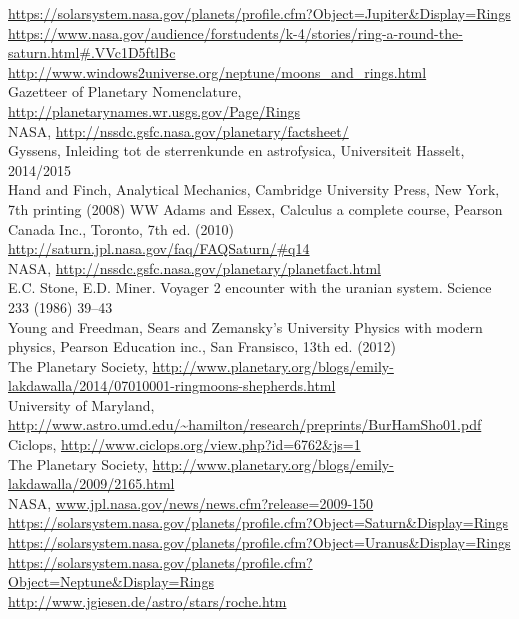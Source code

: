 \documentclass[a4paper]{article}
\begin{document}
\noindent\text{[1]} \url{https://solarsystem.nasa.gov/planets/profile.cfm?Object=Jupiter&Display=Rings}\\
\text{[2]} \url{https://www.nasa.gov/audience/forstudents/k-4/stories/ring-a-round-the-saturn.html#.VVc1D5ftlBc}\\
\text{[3]} \url{http://www.windows2universe.org/neptune/moons_and_rings.html}\\
\text{[4]} Gazetteer of Planetary Nomenclature, \url{http://planetarynames.wr.usgs.gov/Page/Rings}\\
\text{[5]} NASA, \url{http://nssdc.gsfc.nasa.gov/planetary/factsheet/} \\
\text{[6]} Gyssens, Inleiding tot de sterrenkunde en astrofysica, Universiteit Hasselt, 2014/2015 \\
\text{[7]} Hand and Finch, Analytical Mechanics, Cambridge University Press, New York, 7th printing (2008) WW
\text{[8]} Adams and Essex, Calculus a complete course, Pearson Canada Inc., Toronto, 7th ed. (2010) \\
\text{[9]} \url{http://saturn.jpl.nasa.gov/faq/FAQSaturn/#q14} \\
\text{[10]} NASA, \url{http://nssdc.gsfc.nasa.gov/planetary/planetfact.html} \\
\text{[11]} E.C. Stone, E.D. Miner. Voyager 2 encounter with the uranian system. Science 233 (1986) 39–43 \\
\text{[12]} Young and Freedman, Sears and Zemansky’s University Physics with modern physics, Pearson Education inc., San Fransisco, 13th ed. (2012) \\
\text{[13]} The Planetary Society, \url{http://www.planetary.org/blogs/emily-lakdawalla/2014/07010001-ringmoons-shepherds.html} \\
\text{[14]} University of Maryland, \url{http://www.astro.umd.edu/~hamilton/research/preprints/BurHamSho01.pdf} \\
\text{[15]} Ciclops, \url{http://www.ciclops.org/view.php?id=6762&js=1} \\
\text{[16]} The Planetary Society, \url{http://www.planetary.org/blogs/emily-lakdawalla/2009/2165.html} \\
\text{[17]} NASA, \url{www.jpl.nasa.gov/news/news.cfm?release=2009-150}\\
\text{[18]} \url{https://solarsystem.nasa.gov/planets/profile.cfm?Object=Saturn&Display=Rings}\\
\text{[19]} \url{https://solarsystem.nasa.gov/planets/profile.cfm?Object=Uranus&Display=Rings}\\
\text{[20]} \url{https://solarsystem.nasa.gov/planets/profile.cfm?Object=Neptune&Display=Rings}\\
\text{[21]} \url{http://www.jgiesen.de/astro/stars/roche.htm}
\end{document}
